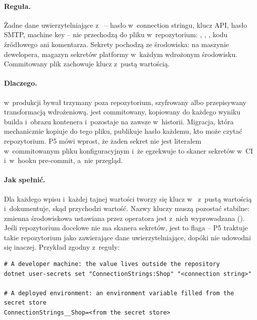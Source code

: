 \paragraph{Reguła.} Żadne dane uwierzytelniające z~ -- hasło
w~connection stringu, klucz API, hasło SMTP, machine key -- nie przechodzą do pliku
w~repozytorium: , ,
, kodu źródłowego ani komentarza. Sekrety pochodzą ze
środowiska:  na maszynie dewelopera, magazyn sekretów platformy
w~każdym wdrożonym środowisku. Commitowany plik zachowuje klucz z~pustą wartością.

\paragraph{Dlaczego.}  w~produkcji bywał trzymany poza repozytorium,
szyfrowany albo przepisywany transformacją wdrożeniową.  jest
commitowany, kopiowany do każdego wyniku builda i~obrazu kontenera i~pozostaje na zawsze
w~historii. Migracja, która mechanicznie kopiuje  do tego
pliku, publikuje hasło każdemu, kto może czytać repozytorium. P5 mówi wprost, że żaden
sekret nie jest literałem w~commitowanym pliku konfiguracyjnym i~że egzekwuje to skaner
sekretów w~CI i~w~hooku pre-commit, a~nie przegląd.

\paragraph{Jak spełnić.} Dla każdego wpisu  i~każdej tajnej
wartości  tworzy się klucz w~ z~pustą
wartością i~dokumentuje, skąd przychodzi wartość. Nazwy kluczy muszą pozostać stabilne:
zmienna środowiskowa ustawiana przez operatora jest z~nich wyprowadzana
(). Jeśli repozytorium docelowe nie ma skanera sekretów,
jest to flaga -- P5 traktuje takie repozytorium jako zawierające dane uwierzytelniające,
dopóki nie udowodni się inaczej. Przykład zgodny z~reguły:

\begin{lstlisting}
# A developer machine: the value lives outside the repository
dotnet user-secrets set "ConnectionStrings:Shop" "<connection string>"

# A deployed environment: an environment variable filled from the secret store
ConnectionStrings__Shop=<from the secret store>
\end{lstlisting}

